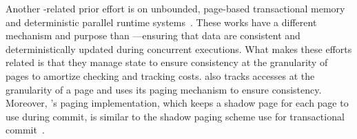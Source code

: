 Another \sys-related prior effort is on unbounded, page-based transactional memory and deterministic parallel runtime systems~\cite{pagebasedtm,grace}. These works have a different mechanism and purpose than \sys---ensuring that data are consistent and deterministically updated during concurrent executions. What makes these
efforts related is that they manage state to ensure consistency at the
granularity of pages to amortize checking and tracking costs. \sys also tracks
accesses at the granularity of a page and uses its paging mechanism to ensure
consistency. Moreover, \sys's paging implementation, which keeps a shadow page
for each page to use during commit, is similar to the shadow paging scheme
use for transactional commit~\cite{pagebasedtm}.
